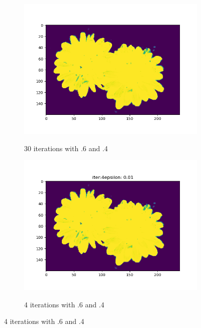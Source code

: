 \documentclass[12pt]{article}
\begin{document}
\begin{section}{4.6}
\begin{figure}[H]
	\centering
	\begin{subfigure}{.5\textwidth}
		\centering
		\includegraphics[width=.8\linewidth]{30iterepi0_01_46v2.png}
		\label{46res1}
		\caption{30 iterations with .6 and .4}
	\end{subfigure}%
	\begin{subfigure}{.5\textwidth}
		\centering
		\includegraphics[width=.8\linewidth]{iter4_0_01_46v2.png}
		\label{46res2}
		\caption{4 iterations with .6 and .4}
	\end{subfigure}
	\label{fig:test3}
\end{figure}

\end{section}
\end{document}
